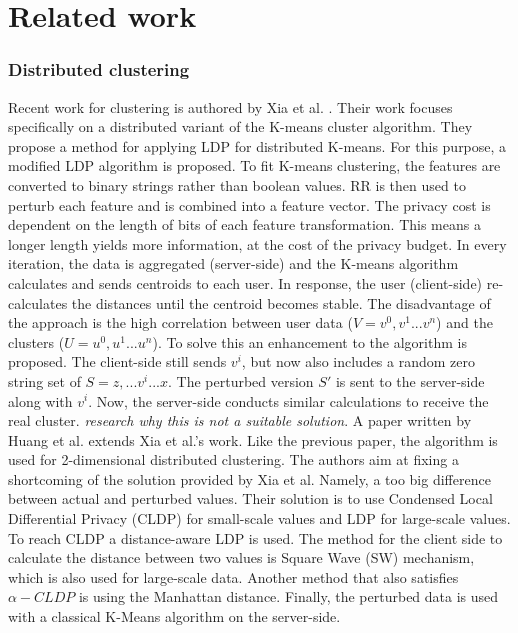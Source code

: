 \chapter{Related work}
\subsection*{Distributed clustering}
Recent work for clustering is authored by Xia et al. \cite{xia_distributed_2020}.
Their work focuses specifically on a distributed variant of the K-means cluster algorithm.
They propose a method for applying LDP for distributed K-means. For this purpose, a modified LDP algorithm is proposed.
To fit K-means clustering, the features are converted to binary strings rather than boolean values. RR is then used to perturb each feature and is combined into a feature vector.
The privacy cost is dependent on the length of bits of each feature transformation. This means a longer length yields more information, at the cost of the privacy budget.
In every iteration, the data is aggregated (server-side) and the K-means algorithm calculates and sends centroids to each user.
In response, the user (client-side) re-calculates the distances until the centroid becomes stable.
The disadvantage of the approach is the high correlation between user data ($V = {v^0, v^1...v^n}$) and the clusters ($U = {u^0, u^1...u^n}$).
To solve this an enhancement to the algorithm is proposed. The client-side still sends $v^i$, but now also includes a random zero string set of $S = {z,...v^i...x}$.
The perturbed version $S'$ is sent to the server-side along with $v^i$. Now, the server-side conducts similar calculations to receive the real cluster.
\textit{research why this is not a suitable solution}. \newline
A paper written by Huang et al. \cite{9679364} extends Xia et al.'s work.
Like the previous paper, the algorithm is used for 2-dimensional distributed clustering.
The authors aim at fixing a shortcoming of the solution provided by Xia et al.
Namely, a too big difference between actual and perturbed values.
Their solution is to use Condensed Local Differential Privacy (CLDP) for small-scale values and LDP for large-scale values.
To reach CLDP a distance-aware LDP is used.
The method for the client side to calculate the distance between two values is Square Wave (SW) mechanism, which is also used for large-scale data.
Another method that also satisfies $\alpha-CLDP$ is using the Manhattan distance.
Finally, the perturbed data is used with a classical K-Means algorithm on the server-side.


